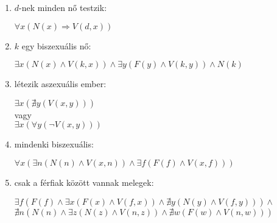\documentclass[12pt]{article}
\begin{document}
\begin{enumerate}
    \item $d$-nek minden nő testzik:
    \begin{center}
        $\forall x(N(x) \Rightarrow V(d,x))$
    \end{center}
    
    \item $k$ egy biszexuális nő:
    \begin{center}
        $\exists x(N(x) \land V(k,x)) \land \exists y(F(y) \land V(k,y)) \land N(k)$
    \end{center}
    
    \item létezik aszexuális ember:
    \begin{center}
        $\exists x(\nexists y(V(x,y)))$\\
        vagy\\
        $\exists x(\forall y(\neg V(x,y)))$
    \end{center}
    
    \item mindenki biszexuális:
    \begin{center}
        $\forall x(\exists n(N(n) \land V(x,n)) \land \exists f(F(f) \land V(x,f)))$
    \end{center}
    
    \item csak a férfiak között vannak melegek:
    \begin{center}
    
        $\exists f(F(f) \land \exists x(F(x) \land V(f,x)) \land \nexists y(N(y) \land V(f,y))) \land$
        $\nexists n(N(n) \land \exists z(N(z) \land V(n,z)) \land \nexists w(F(w) \land V(n,w)))$
    \end{center}
\end{enumerate}
\end{document}
